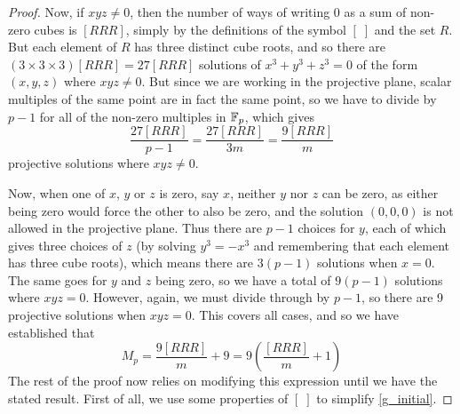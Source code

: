 \begin{proof}
Now, if $xyz\neq0$, then the number of ways of writing $0$ as a sum of non-zero cubes is $[RRR]$, simply by the definitions of the symbol $[\;]$ and the set $R$.
But each element of $R$ has three distinct cube roots, and so there are $(3 \times 3 \times 3) [RRR] = 27[RRR]$ solutions of $x^3 + y^3 + z^3 = 0$ of the form $(x,y,z)$ where $xyz \neq 0$.
But since we are working in the projective plane, scalar multiples of the same point are in fact the same point, so we have to divide by $p-1$ for all of the non-zero multiples in $\mathbb{F}_p$, which gives
$$\frac{27[RRR]}{p-1} = \frac{27[RRR]}{3m} = \frac{9[RRR]}{m}$$
projective solutions where $xyz\neq0$.

Now, when one of $x$, $y$ or $z$ is zero, say $x$, neither $y$ nor $z$ can be zero, as either being zero would force the other to also be zero, and the solution $(0,0,0)$ is not allowed in the projective plane.
Thus there are $p-1$ choices for $y$, each of which gives three choices of $z$ (by solving $y^3 = -x^3$ and remembering that each element has three cube roots), which means there are $3(p-1)$ solutions when $x=0$.
The same goes for $y$ and $z$ being zero, so we have a total of $9(p-1)$ solutions where $xyz=0$.
However, again, we must divide through by $p-1$, so there are 9 projective solutions when $xyz=0$.
This covers all cases, and so we have established that
\begin{equation}
M_p = \frac{9[RRR]}{m} + 9 = 9 \left(\frac{[RRR]}{m}+1\right) \label{g_initial}
\end{equation}
The rest of the proof now relies on modifying this expression until we have the stated result.
First of all, we use some properties of $[\;]$ to simplify \eqref{g_initial}.


\end{proof}
